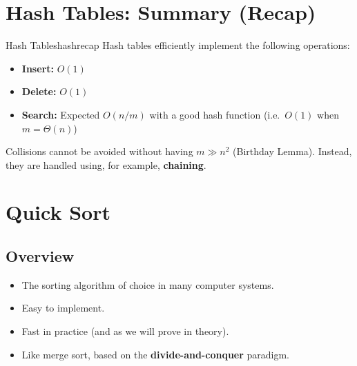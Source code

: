 
\section*{Hash Tables: Summary (Recap)}

\begin{complexity}{Hash Tables}{hashrecap}
Hash tables efficiently implement the following operations:
\begin{itemize}[noitemsep]
  \item \textbf{Insert:} $O(1)$
  \item \textbf{Delete:} $O(1)$
  \item \textbf{Search:} Expected $O(n/m)$ with a good hash function (i.e.\ $O(1)$ when
        $m = \Theta(n)$)
\end{itemize}
Collisions cannot be avoided without having $m \gg n^2$ (Birthday Lemma). Instead, they are
handled using, for example, \textbf{chaining}.
\end{complexity}

\section*{Quick Sort}

\subsection{Overview}

\begin{itemize}[noitemsep]
  \item The sorting algorithm of choice in many computer systems.
  \item Easy to implement.
  \item Fast in practice (and as we will prove in theory).
  \item Like merge sort, based on the \textbf{divide-and-conquer} paradigm.
\end{itemize}

